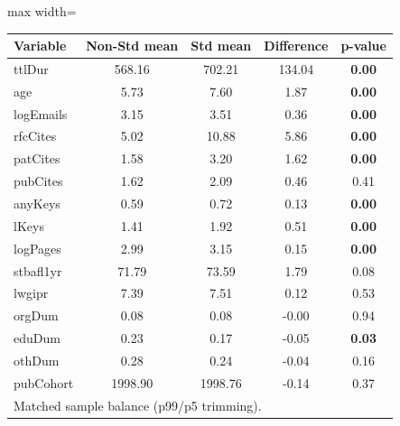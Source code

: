\begin{adjustbox}{max width=\textwidth}
\begin{tabular}{lcccc}
\toprule
Variable & Non-Std mean & Std mean & Difference & p-value \\
\midrule
ttlDur & 568.16 & 702.21 & 134.04 & \textbf{0.00} \\
age & 5.73 & 7.60 & 1.87 & \textbf{0.00} \\
logEmails & 3.15 & 3.51 & 0.36 & \textbf{0.00} \\
rfcCites & 5.02 & 10.88 & 5.86 & \textbf{0.00} \\
patCites & 1.58 & 3.20 & 1.62 & \textbf{0.00} \\
pubCites & 1.62 & 2.09 & 0.46 & 0.41 \\
anyKeys & 0.59 & 0.72 & 0.13 & \textbf{0.00} \\
lKeys & 1.41 & 1.92 & 0.51 & \textbf{0.00} \\
logPages & 2.99 & 3.15 & 0.15 & \textbf{0.00} \\
stbafl1yr & 71.79 & 73.59 & 1.79 & 0.08 \\
lwgipr & 7.39 & 7.51 & 0.12 & 0.53 \\
orgDum & 0.08 & 0.08 & -0.00 & 0.94 \\
eduDum & 0.23 & 0.17 & -0.05 & \textbf{0.03} \\
othDum & 0.28 & 0.24 & -0.04 & 0.16 \\
pubCohort & 1998.90 & 1998.76 & -0.14 & 0.37 \\
\bottomrule
\multicolumn{5}{l}{\footnotesize Matched sample balance (p99/p5 trimming).} \\
\end{tabular}
\end{adjustbox}
